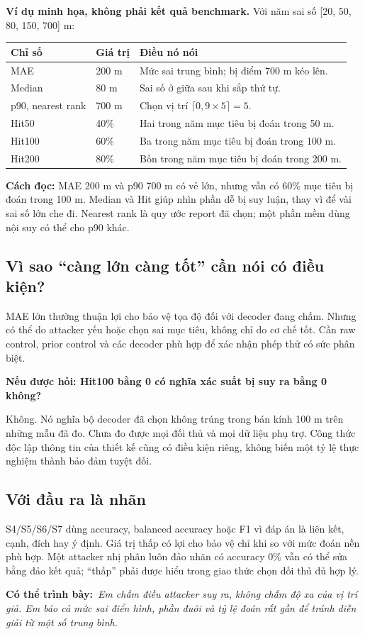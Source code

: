 \documentclass[10pt,a4paper]{article}
\newcommand{\say}[1]{\par\textbf{Có thể trình bày:}\ \textit{#1}\par}
\newcommand{\ask}[2]{\par\textbf{Nếu được hỏi: #1}\par #2\par}
\newcommand{\example}{\textbf{Ví dụ minh họa, không phải kết quả benchmark.} }
\begin{document}
\example Với năm sai số [20, 50, 80, 150, 700] m:
\begin{longtable}{@{}P{4.0cm}P{3.5cm}P{8.7cm}@{}}
\toprule Chỉ số & Giá trị & Điều nó nói\\\midrule
MAE & 200 m & Mức sai trung bình; bị điểm 700 m kéo lên.\\[3pt]
Median & 80 m & Sai số ở giữa sau khi sắp thứ tự.\\[3pt]
p90, nearest rank & 700 m & Chọn vị trí $\lceil0,9\times5\rceil=5$.\\[3pt]
Hit50 & 40\% & Hai trong năm mục tiêu bị đoán trong 50 m.\\[3pt]
Hit100 & 60\% & Ba trong năm mục tiêu bị đoán trong 100 m.\\[3pt]
Hit200 & 80\% & Bốn trong năm mục tiêu bị đoán trong 200 m.\\
\bottomrule
\end{longtable}

\textbf{Cách đọc:} MAE 200 m và p90 700 m có vẻ lớn, nhưng vẫn có 60\% mục tiêu bị đoán trong 100 m. Median và Hit giúp nhìn phần dễ bị suy luận, thay vì để vài sai số lớn che đi. Nearest rank là quy ước report đã chọn; một phần mềm dùng nội suy có thể cho p90 khác.

\subsection*{Vì sao ``càng lớn càng tốt'' cần nói có điều kiện?}
MAE lớn thường thuận lợi cho bảo vệ tọa độ đối với decoder đang chấm. Nhưng có thể do attacker yếu hoặc chọn sai mục tiêu, không chỉ do cơ chế tốt. Cần raw control, prior control và các decoder phù hợp để xác nhận phép thử có sức phân biệt.

\ask{Hit100 bằng 0 có nghĩa xác suất bị suy ra bằng 0 không?}{Không. Nó nghĩa bộ decoder đã chọn không trúng trong bán kính 100 m trên những mẫu đã đo. Chưa đo được mọi đối thủ và mọi dữ liệu phụ trợ. Công thức độc lập thông tin của thiết kế cũng có điều kiện riêng, không biến một tỷ lệ thực nghiệm thành bảo đảm tuyệt đối.}

\subsection*{Với đầu ra là nhãn}
S4/S5/S6/S7 dùng accuracy, balanced accuracy hoặc F1 vì đáp án là liên kết, cạnh, đích hay ý định. Giá trị thấp có lợi cho bảo vệ chỉ khi so với mức đoán nền phù hợp. Một attacker nhị phân luôn đảo nhãn có accuracy 0\% vẫn có thể sửa bằng đảo kết quả; ``thấp'' phải được hiểu trong giao thức chọn đối thủ đủ hợp lý.
\say{Em chấm điều attacker suy ra, không chấm độ xa của vị trí giả. Em báo cả mức sai điển hình, phần đuôi và tỷ lệ đoán rất gần để tránh diễn giải từ một số trung bình.}
\end{document}
